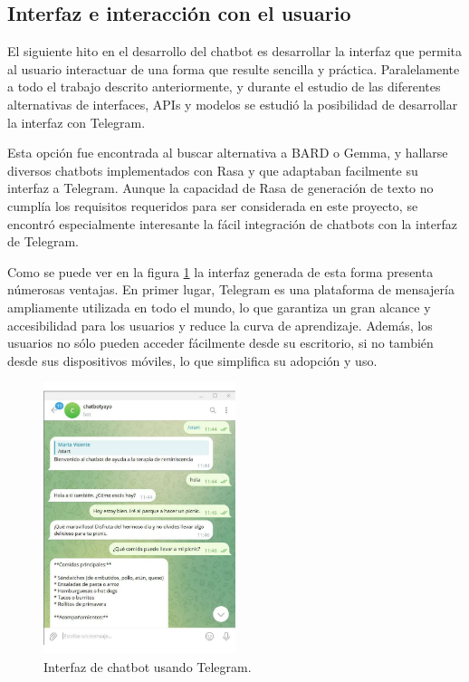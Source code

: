 \subsection{Interfaz e interacción con el usuario}
El siguiente hito en el desarrollo del chatbot es desarrollar la interfaz que permita al usuario interactuar de una forma que resulte sencilla y práctica. Paralelamente a todo el trabajo descrito anteriormente, y durante el estudio de las diferentes alternativas de interfaces, APIs y modelos se estudió la posibilidad de desarrollar la interfaz con Telegram. 

Esta opción fue encontrada al buscar alternativa a BARD o Gemma, y hallarse diversos chatbots implementados con Rasa y que adaptaban facilmente su interfaz a Telegram. Aunque la capacidad de Rasa de generación de texto no cumplía los requisitos requeridos para ser considerada en este proyecto, se encontró especialmente interesante la fácil integración de chatbots con la interfaz de Telegram. 

Como se puede ver en la figura \ref{fig:ejemploRASATELEGRAM} la interfaz generada de esta forma presenta númerosas ventajas. En primer lugar, Telegram es una plataforma de mensajería ampliamente utilizada en todo el mundo, lo que garantiza un gran alcance y accesibilidad para los usuarios y reduce la curva de aprendizaje. Además, los usuarios no sólo pueden acceder fácilmente desde su escritorio, si no también desde sus dispositivos móviles, lo que simplifica su adopción y uso.

\begin{figure}
	\centering
	\includegraphics[width=0.5\textwidth]{Imagenes/telegram1}
	\caption{ Interfaz de chatbot usando Telegram.}
	\label{fig:ejemploRASATELEGRAM}
\end{figure}

